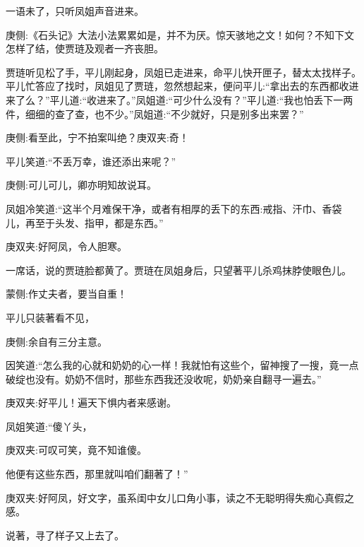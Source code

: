 \begin{parag}
    一语未了，只听凤姐声音进来。\begin{note}庚侧:《石头记》大法小法累累如是，并不为厌。惊天骇地之文！如何？不知下文怎样了结，使贾琏及观者一齐丧胆。\end{note}贾琏听见松了手，平儿刚起身，凤姐已走进来，命平儿快开匣子，替太太找样子。平儿忙答应了找时，凤姐见了贾琏，忽然想起来，便问平儿:“拿出去的东西都收进来了么？”平儿道:“收进来了。”凤姐道:“可少什么没有？”平儿道:“我也怕丢下一两件，细细的查了查，也不少。”凤姐道:“不少就好，只是别多出来罢？”\begin{note}庚侧:看至此，宁不拍案叫绝？庚双夹:奇！\end{note}平儿笑道:“不丢万幸，谁还添出来呢？”\begin{note}庚侧:可儿可儿，卿亦明知故说耳。\end{note}凤姐冷笑道:“这半个月难保干净，或者有相厚的丢下的东西:戒指、汗巾、香袋儿，再至于头发、指甲，都是东西。”\begin{note}庚双夹:好阿凤，令人胆寒。\end{note}一席话，说的贾琏脸都黄了。贾琏在凤姐身后，只望著平儿杀鸡抹脖使眼色儿。\begin{note}蒙侧:作丈夫者，要当自重！\end{note}平儿只装著看不见，\begin{note}庚侧:余自有三分主意。\end{note}因笑道:“怎么我的心就和奶奶的心一样！我就怕有这些个，留神搜了一搜，竟一点破绽也没有。奶奶不信时，那些东西我还没收呢，奶奶亲自翻寻一遍去。”\begin{note}庚双夹:好平儿！遍天下惧内者来感谢。\end{note}凤姐笑道:“傻丫头，\begin{note}庚双夹:可叹可笑，竟不知谁傻。\end{note}他便有这些东西，那里就叫咱们翻著了！”\begin{note}庚双夹:好阿凤，好文字，虽系闺中女儿口角小事，读之不无聪明得失痴心真假之感。\end{note}说著，寻了样子又上去了。
\end{parag}


